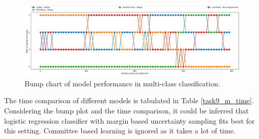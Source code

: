 \begin{figure}[h]
	\centering
	\includegraphics[scale=0.3]{images/task9_rank}
	\caption{Bump chart of model performance in multi-class classification.}
	\label{t9_m_bump}
\end{figure}



The time comparison of different models is tabulated in Table \ref{task9_m_time}. Considering the bump plot and the time comparison, it could be inferred that logistic regression classifier with margin based uncertainty sampling fits best for this setting. Committee based learning is ignored as it takes a lot of time.

